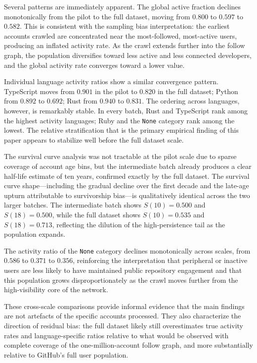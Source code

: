 \documentclass[12pt,a4paper]{article}
\begin{document}
Several patterns are immediately apparent. The global active fraction declines monotonically from the pilot to the full dataset, moving from $0.800$ to $0.597$ to $0.582$. This is consistent with the sampling bias interpretation: the earliest accounts crawled are concentrated near the most-followed, most-active users, producing an inflated activity rate. As the crawl extends further into the follow graph, the population diversifies toward less active and less connected developers, and the global activity rate converges toward a lower value.

Individual language activity ratios show a similar convergence pattern. TypeScript moves from $0.901$ in the pilot to $0.820$ in the full dataset; Python from $0.892$ to $0.692$; Rust from $0.940$ to $0.831$. The ordering across languages, however, is remarkably stable. In every batch, Rust and TypeScript rank among the highest activity languages; Ruby and the \texttt{None} category rank among the lowest. The relative stratification that is the primary empirical finding of this paper appears to stabilize well before the full dataset scale.

The survival curve analysis was not tractable at the pilot scale due to sparse coverage of account age bins, but the intermediate batch already produces a clear half-life estimate of ten years, confirmed exactly by the full dataset. The survival curve shape---including the gradual decline over the first decade and the late-age upturn attributable to survivorship bias---is qualitatively identical across the two larger batches. The intermediate batch shows $S(10) = 0.500$ and $S(18) = 0.500$, while the full dataset shows $S(10) = 0.535$ and $S(18) = 0.713$, reflecting the dilution of the high-persistence tail as the population expands.

The activity ratio of the \texttt{None} category declines monotonically across scales, from $0.586$ to $0.371$ to $0.356$, reinforcing the interpretation that peripheral or inactive users are less likely to have maintained public repository engagement and that this population grows disproportionately as the crawl moves further from the high-visibility core of the network.

These cross-scale comparisons provide informal evidence that the main findings are not artefacts of the specific accounts processed. They also characterize the direction of residual bias: the full dataset likely still overestimates true activity rates and language-specific ratios relative to what would be observed with complete coverage of the one-million-account follow graph, and more substantially relative to GitHub's full user population.
\end{document}
